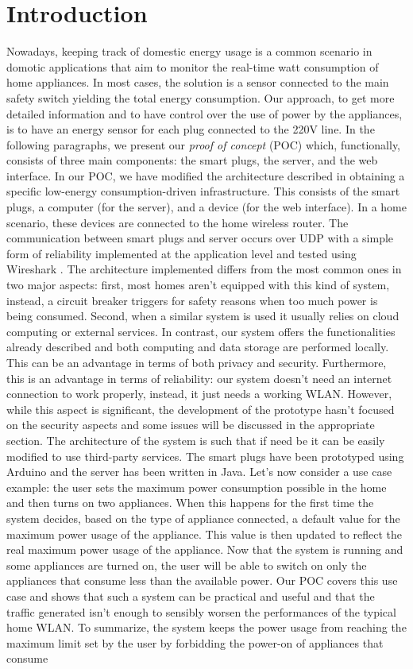 \documentclass[conference]{IEEEtran}
\begin{document}
\section{Introduction}
Nowadays, keeping track of domestic energy usage is a common scenario in domotic applications that aim to monitor the real-time watt consumption of home appliances. In most cases, the solution is a sensor connected to the main safety switch yielding the total energy consumption. Our approach, to get more detailed information and to have control over the use of power by the appliances, is to have an energy sensor for each plug connected to the 220V line. In the following paragraphs, we present our \textit{proof of concept} (POC) which, functionally, consists of three main components: the smart plugs, the server, and the web interface. In our POC, we have modified the architecture described in \cite{8110428} obtaining a specific low-energy consumption-driven infrastructure. This consists of the smart plugs, a computer (for the server), and a device (for the web interface). In a home scenario, these devices are connected to the home wireless router. The communication between smart plugs and server occurs over UDP with a simple form of reliability implemented at the application level and tested using Wireshark \cite{wireshark}. The architecture implemented differs from the most common ones in two major aspects: first, most homes aren't equipped with this kind of system, instead, a circuit breaker triggers for safety reasons when too much power is being consumed. Second, when a similar system is used it usually relies on cloud computing or external services. In contrast, our system offers the functionalities already described and both computing and data storage are performed locally. This can be an advantage in terms of both privacy and security. Furthermore, this is an advantage in terms of reliability: our system doesn't need an internet connection to work properly, instead, it just needs a working WLAN. However, while this aspect is significant, the development of the prototype hasn't focused on the security aspects and some issues will be discussed in the appropriate section. The architecture of the system is such that if need be it can be easily modified to use third-party services. The smart plugs have been prototyped using Arduino and the server has been written in Java. Let's now consider a use case example: the user sets the maximum power consumption possible in the home and then turns on two appliances. When this happens for the first time the system decides, based on the type of appliance connected, a default value for the maximum power usage of the appliance. This value is then updated to reflect the real maximum power usage of the appliance. Now that the system is running and some appliances are turned on, the user will be able to switch on only the appliances that consume less than the available power. Our POC covers this use case and shows that such a system can be practical and useful and that the traffic generated isn't enough to sensibly worsen the performances of the typical home WLAN. To summarize, the system keeps the power usage from reaching the maximum limit set by the user by forbidding the power-on of appliances that consume 
\end{document}
